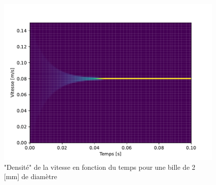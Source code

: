 \begin{minipage}{0.475\textwidth}
    \begin{figure}[H]
        \centering
        \includegraphics[scale=0.54]{graph/densplot}
        \caption{"Densité" de la vitesse en fonction du temps pour une bille de 2 [mm] de diamètre}
        \label{fig:densplot}
    \end{figure}
\end{minipage}
